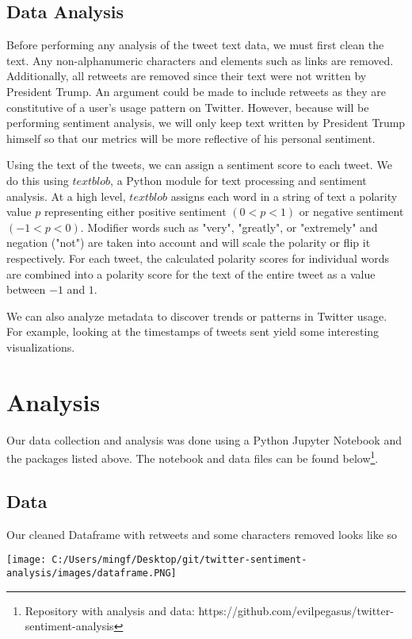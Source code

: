 \documentclass[11pt]{article} %
\begin{document}
\subsection{Data Analysis}

Before performing any analysis of the tweet text data, we must first clean the text.
Any non-alphanumeric characters and elements such as links are removed.
Additionally, all retweets are removed since their text were not written by President Trump.
An argument could be made to include retweets as they are constitutive of a user's usage pattern on Twitter.
However, because will be performing sentiment analysis, we will only keep text written by President Trump himself so that our metrics will be more reflective of his personal sentiment. 

Using the text of the tweets, we can assign a sentiment score to each tweet.
We do this using $textblob$, a Python module for text processing and sentiment analysis.
At a high level, $textblob$ assigns each word in a string of text a polarity value $p$ representing either positive sentiment $(0 < p < 1)$ or negative sentiment $(-1 < p < 0)$.
Modifier words such as "very", "greatly", or "extremely" and negation ("not") are taken into account and will scale the polarity or flip it respectively.
For each tweet, the calculated polarity scores for individual words are combined into a polarity score for the text of the entire tweet as a value between $-1$ and $1$.

We can also analyze metadata to discover trends or patterns in Twitter usage.
For example, looking at the timestamps of tweets sent yield some interesting visualizations.

\section{Analysis}

Our data collection and analysis was done using a Python Jupyter Notebook and the packages listed above.
The notebook and data files can be found below\footnote{Repository with analysis and data: https://github.com/evilpegasus/twitter-sentiment-analysis}.

\subsection{Data}

Our cleaned Dataframe with retweets and some characters removed looks like so

\begin{center}
    \texttt{[image: C:/Users/mingf/Desktop/git/twitter-sentiment-analysis/images/dataframe.PNG]}
\end{center}
\end{document}
